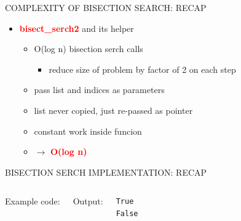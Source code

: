 \documentclass[aspectratio=169]{beamer}
\begin{document}
\begin{frame}{COMPLEXITY OF BISECTION SEARCH: RECAP}
\begin{itemize}
\item \textcolor{red}{\textbf{bisect\_serch2}} and its helper
\begin{itemize}
\item O(log n) bisection serch calls
\begin{itemize}
\item reduce size of problem by factor of 2 on each step
\end{itemize}
\item pass list and indices as parameters
\item list never copied, just re-passed as pointer
\item constant work inside funcion
\item $\rightarrow$ \textcolor{red}{\textbf{O(log n)}}
\end{itemize}

\end{itemize}

\end{frame}

\begin{frame}[fragile]{BISECTION SERCH IMPLEMENTATION: RECAP}
\begin{columns}
Example code:

Output:
\begin{block}{}
\begin{verbatim}
True
False
\end{verbatim}
\end{block}
\end{columns}

\end{frame}
\end{document}
